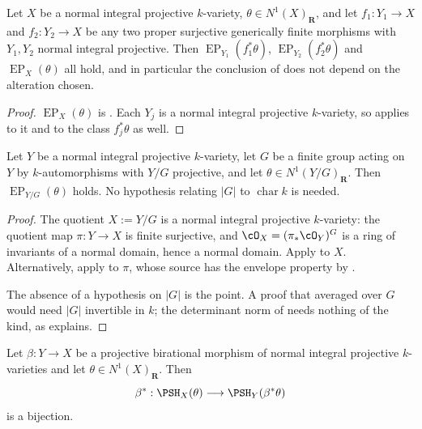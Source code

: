 \begin{corollary}
\label{cor:ch42-independence-of-alteration}
Let $X$ be a normal integral projective $k$-variety,
$\theta\in N^1(X)_{\mathbf R}$, and let $f_1:Y_1\to X$ and
$f_2:Y_2\to X$ be any two proper surjective generically finite morphisms
with $Y_1,Y_2$ normal integral projective.  Then
$\operatorname{EP}_{Y_1}(f_1^*\theta)$,
$\operatorname{EP}_{Y_2}(f_2^*\theta)$ and
$\operatorname{EP}_X(\theta)$ all hold, and in particular the conclusion
of  does not depend on the alteration
chosen.
\end{corollary}

\begin{proof}
$\operatorname{EP}_X(\theta)$ is .  Each
$Y_j$ is a normal integral projective $k$-variety, so
 applies to it and to the class $f_j^*\theta$
as well.
\end{proof}

\begin{corollary}
\label{cor:ch42-quotient}
Let $Y$ be a normal integral projective $k$-variety, let $G$ be a
finite group acting on $Y$ by $k$-automorphisms with
$Y/G$ projective, and let $\theta\in N^1(Y/G)_{\mathbf R}$.  Then
$\operatorname{EP}_{Y/G}(\theta)$ holds.  No hypothesis relating
$|G|$ to $\operatorname{char}k$ is needed.
\end{corollary}

\begin{proof}
The quotient $X:=Y/G$ is a normal integral projective $k$-variety: the
quotient map $\pi:Y\to X$ is finite surjective, and $\cO_X=(\pi_*\cO_Y)^G$
is a ring of invariants of a normal domain, hence a normal domain.  Apply
 to $X$.  Alternatively, apply
 to $\pi$, whose source has the envelope
property by .

The absence of a hypothesis on $|G|$ is the point.  A proof that averaged
over $G$ would need $|G|$ invertible in $k$; the determinant norm of
 needs nothing of the kind, as
 explains.
\end{proof}

\begin{corollary}
\label{cor:ch42-birational-bijection}
Let $\beta:Y\to X$ be a projective birational morphism of normal integral
projective $k$-varieties and let $\theta\in N^1(X)_{\mathbf R}$.  Then
\[
 \beta^*:\PSH_X(\theta)\longrightarrow\PSH_Y(\beta^*\theta)
\]
is a bijection.
\end{corollary}

